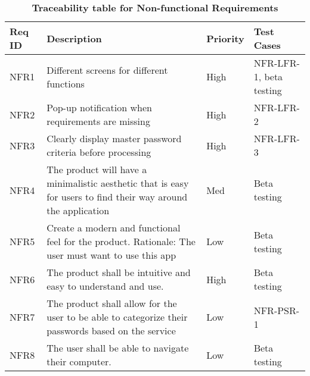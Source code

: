 \documentclass[12pt, titlepage]{article}
\begin{document}
\begin{table}[!htbp]
    \caption{\textbf{Traceability table for Non-functional Requirements}} \label{Table}
    \small
    \begin{tabularx}{\textwidth}{p{2cm}Xp{2cm}X}
        \toprule
        \textbf{Req ID} & \textbf{Description} & \textbf{Priority} & \textbf{Test Cases}\\
        \midrule
        
        NFR1  & Different screens for different functions & High & NFR-LFR-1, beta testing\\\hline
        NFR2  & Pop-up notification when requirements are missing & High & NFR-LFR-2\\\hline
        NFR3  & Clearly display master password criteria before processing & High & NFR-LFR-3\\\hline      
        NFR4  & The product will have a minimalistic aesthetic that is easy for users to find their way around the application & Med & Beta testing\\\hline
        NFR5  & Create a modern and functional feel for the product. Rationale: The user must want to use this app & Low & Beta testing\\\hline
        NFR6  & The product shall be intuitive and easy to understand and use. & High & Beta testing\\\hline
        NFR7  & The product shall allow for the user to be able to categorize their passwords based on the service & Low & NFR-PSR-1\\\hline
        NFR8  & The user shall be able to navigate their computer. & Low & Beta testing\\
        
        \midrule 
    \end{tabularx}
\end{table}
\end{document}
